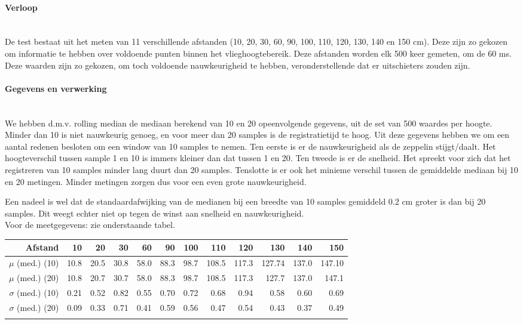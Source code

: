 \documentclass[eind]{penoverslag}
\begin{document}
\paragraph{Verloop} ~\\ 
De test bestaat uit het meten van 11 verschillende afstanden (10, 20, 30, 60, 90, 100, 110, 120, 130, 140 en 150 cm). Deze zijn zo gekozen om informatie te hebben over voldoende punten binnen het vlieghoogtebereik. Deze afstanden worden elk 500 keer gemeten, om de 60 ms. Deze waarden zijn zo gekozen, om toch voldoende nauwkeurigheid te hebben, veronderstellende dat er uitschieters zouden zijn.

\paragraph{Gegevens en verwerking} ~\\ 
We hebben d.m.v. rolling median de mediaan berekend van 10 en 20 opeenvolgende gegevens, uit de set van 500 waardes per hoogte. Minder dan 10 is niet nauwkeurig genoeg, en voor meer dan 20 samples is de registratietijd te hoog. Uit deze gegevens hebben we om een aantal redenen besloten om een window van 10 samples te nemen.  Ten eerste is er de nauwkeurigheid als de zeppelin stijgt/daalt. Het hoogteverschil tussen sample 1 en 10 is immers kleiner dan dat tussen 1 en 20. Ten tweede is er de snelheid. Het spreekt voor zich dat het registreren van 10 samples minder lang duurt dan 20 samples. Tenslotte is er ook het minieme verschil tussen de gemiddelde mediaan bij 10 en 20 metingen. Minder metingen zorgen dus voor een even grote nauwkeurigheid. 

Een nadeel is wel dat de standaardafwijking van de medianen bij een breedte van 10 samples gemiddeld 0.2 cm groter is dan bij 20 samples. Dit weegt echter niet op tegen de winst aan snelheid en nauwkeurigheid.\\ 

Voor de meetgegevens: zie onderstaande tabel. \\

\begin{tabular}{r||r|r|r|r|r|r|r|r|r|r|r}
\textbf{Afstand} & 10 & 20 & 30 & 60 & 90 & 100 & 110 & 120 & 130 & 140 & 150 \\
\hline \hline 
$\mu$ (med.) (10) & 10.8 & 20.5 & 30.8 & 58.0 & 88.3 & 98.7 & 108.5 & 117.3 & 127.74 & 137.0 & 147.10 \\
$\mu$ (med.) (20) & 10.8 & 20.7 & 30.7 & 58.0 & 88.3 & 98.7 & 108.5 & 117.3 & 127.7 & 137.0 & 147.1 \\
$\sigma$ (med.) (10) & 0.21 & 0.52 & 0.82 & 0.55 & 0.70 & 0.72 & 0.68 & 0.94 & 0.58 & 0.60 & 0.69 \\
$\sigma$ (med.) (20)& 0.09 & 0.33 & 0.71 & 0.41 & 0.59 & 0.56 & 0.47 & 0.54 & 0.43 & 0.37 & 0.49 \\
\caption{Gemiddelde en standaardafwijking van de rolling medians van 10 en 20, uit 500 meetwaarden}
\end{tabular}
\end{document}
